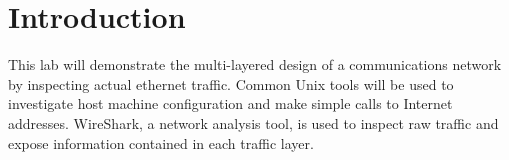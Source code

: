 \section{Introduction}\label{sec:intro}
This lab will demonstrate the multi-layered design of a communications network by inspecting actual ethernet traffic.
Common Unix tools will be used to investigate host machine configuration and make simple calls to Internet addresses.
WireShark, a network analysis tool, is used to inspect raw traffic and expose information contained in each traffic layer.
